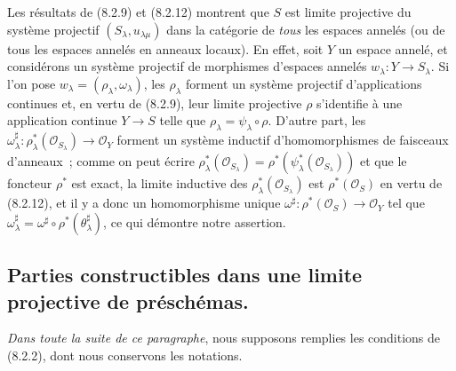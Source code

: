 \begin{remark}[8.2.14]
\label{IV.8.2.14-fr}
Les résultats de (8.2.9) et (8.2.12) montrent que $S$ est limite projective du
système projectif $(S_\lambda,u_{\lambda\mu})$ dans la catégorie de
\emph{tous} les espaces annelés (ou de tous les espaces annelés en anneaux
locaux). En effet, soit $Y$ un espace annelé, et considérons un système
projectif de morphismes d'espaces annelés $w_\lambda:Y\to S_\lambda$. Si
l'on pose $w_\lambda=(\rho_\lambda,\omega_\lambda)$, les $\rho_\lambda$
forment un système projectif d'applications continues et, en vertu de
(8.2.9), leur limite projective $\rho$ s'identifie à une application continue
$Y\to S$ telle que $\rho_\lambda=\psi_\lambda\circ\rho$. D'autre part, les
$\omega_\lambda^\sharp:
\rho_\lambda^*(\mathcal O_{S_\lambda})\to\mathcal O_Y$
forment un système inductif d'homomorphismes de faisceaux d'anneaux~; comme
on peut écrire
$\rho_\lambda^*(\mathcal O_{S_\lambda})=
\rho^*(\psi_\lambda^*(\mathcal O_{S_\lambda}))$ et que le foncteur $\rho^*$
est exact, la limite inductive des
$\rho_\lambda^*(\mathcal O_{S_\lambda})$ est $\rho^*(\mathcal O_S)$ en
vertu de (8.2.12), et il y a donc un homomorphisme unique
$\omega^\sharp:\rho^*(\mathcal O_S)\to\mathcal O_Y$ tel que
$\omega_\lambda^\sharp=\omega^\sharp\circ
\rho^*(\theta_\lambda^\sharp)$, ce qui démontre notre assertion.
\end{remark}

\subsection{Parties constructibles dans une limite projective de préschémas.}
\label{subsection:IV.8.3-fr}

\begin{env}[8.3.1]
\label{IV.8.3.1-fr}
\emph{Dans toute la suite de ce paragraphe}, nous supposons remplies les conditions
de (8.2.2), dont nous conservons les notations.
\end{env}

